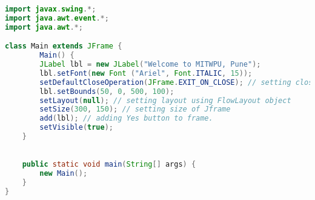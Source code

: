 \documentclass[11pt]{article}
\begin{document}
\begin{lstlisting}[language=Java]
import javax.swing.*;
import java.awt.event.*;
import java.awt.*;

class Main extends JFrame {
		Main() {
		JLabel lbl = new JLabel("Welcome to MITWPU, Pune");
		lbl.setFont(new Font ("Ariel", Font.ITALIC, 15));
		setDefaultCloseOperation(JFrame.EXIT_ON_CLOSE); // setting close operation.
		lbl.setBounds(50, 0, 500, 100);
		setLayout(null); // setting layout using FlowLayout object
		setSize(300, 150); // setting size of Jframe
		add(lbl); // adding Yes button to frame.
		setVisible(true);
	}

	
	public static void main(String[] args) {
		new Main();
	}
}
\end{lstlisting}
\end{document}
